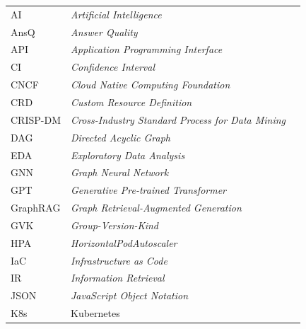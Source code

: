 \begin{longtable}{@{} l >{\raggedright\arraybackslash}p{8cm} c @{}}
AI       & \textit{Artificial Intelligence}                               & \pageref{chap:pendahuluan} \\
AnsQ     & \textit{Answer Quality}                                        & \pageref{sec:metrik-evaluasi} \\
API      & \textit{Application Programming Interface}                     & \pageref{chap:pendahuluan} \\
CI       & \textit{Confidence Interval}                                   & \pageref{chap:evaluasi} \\
CNCF     & \textit{Cloud Native Computing Foundation}                     & \pageref{chap:pendahuluan} \\
CRD      & \textit{Custom Resource Definition}                            & \pageref{chap:implementasi} \\
CRISP-DM & \textit{Cross-Industry Standard Process for Data Mining}       & \pageref{chap:pendahuluan} \\
DAG      & \textit{Directed Acyclic Graph}                                & \pageref{chap:implementasi} \\
EDA      & \textit{Exploratory Data Analysis}                             & \pageref{chap:analisis-masalah} \\
GNN      & \textit{Graph Neural Network}                                  & \pageref{chap:analisis-masalah} \\
GPT      & \textit{Generative Pre-trained Transformer}                    & \pageref{chap:pendahuluan} \\
GraphRAG & \textit{Graph Retrieval-Augmented Generation}                  & \pageref{chap:pendahuluan} \\
GVK      & \textit{Group-Version-Kind}                                    & \pageref{chap:analisis-masalah} \\
HPA      & \textit{HorizontalPodAutoscaler}                               & \pageref{chap:studi-literatur} \\
IaC      & \textit{Infrastructure as Code}                                & \pageref{chap:studi-literatur} \\
IR       & \textit{Information Retrieval}                                 & \pageref{sec:metrik-evaluasi} \\
JSON     & \textit{JavaScript Object Notation}                            & \pageref{chap:analisis-masalah} \\
K8s      & Kubernetes                                                     & \pageref{chap:pendahuluan} \\

\end{longtable}
